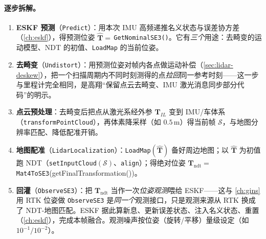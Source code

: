 \paragraph{逐步拆解。}
\begin{enumerate}
  \item \textbf{ESKF 预测}（\texttt{Predict}）：用本次 IMU 高频递推名义状态与误差协方差（\cref{ch:eskf}），得预测位姿 $\hat{\mathbf T}=\,$\texttt{GetNominalSE3()}。它有\emph{三个}用途：去畸变的运动模型、NDT 的初值、\texttt{LoadMap} 的当前位姿。
  \item \textbf{去畸变}（\texttt{Undistort}）：用预测位姿对帧内各点做运动补偿（\cref{sec:lidar-deskew}），把一个扫描周期内不同时刻测得的点\emph{拉回}同一参考时刻——这一步与里程计完全相同，是高翔“保留点云去畸变、IMU 激光消息同步部分代码”的明示。
  \item \textbf{点云预处理}：去畸变后把点从激光系经外参 $\mathbf T_{IL}$ 变到 IMU/车体系（\texttt{transformPointCloud}），再体素降采样（如 $0.5$\,m）得当前帧 $\mathcal S$，与地图分辨率匹配、降低配准开销。
  \item \textbf{地图配准}（\texttt{LidarLocalization}）：\texttt{LoadMap}$(\hat{\mathbf T})$ 备好周边地图；以 $\hat{\mathbf T}$ 为初值跑 NDT（\texttt{setInputCloud}$(\mathcal S)$、\texttt{align}）；得绝对位姿 $\mathbf T_{\mathrm{ndt}}=\,$\texttt{Mat4ToSE3}(getFinalTransformation())。
  \item \textbf{回灌}（\texttt{ObserveSE3}）：把 $\mathbf T_{\mathrm{ndt}}$ 当作一次\emph{位姿观测}喂给 ESKF——这与 \cref{ch:gins} 用 RTK 位姿做 \texttt{ObserveSE3} 是\emph{同一个}观测接口，只是观测来源从 RTK 换成了 NDT-地图匹配。ESKF 据此算新息、更新误差状态、注入名义状态、重置（\cref{ch:eskf}），完成本帧融合。观测噪声按位姿（旋转/平移）量级设定（如 $10^{-1}/10^{-2}$）。
\end{enumerate}

